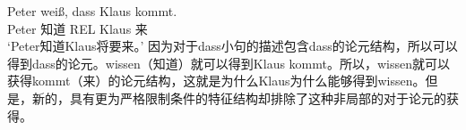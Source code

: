 \ea
\gll Peter weiß, dass Klaus kommt.\\
	 Peter 知道 REL Klaus 来\\
\glt `Peter知道Klaus将要来。'
\z
因为对于dass小句的描述包含dass的论元结构，所以可以得到dass的论元。wissen（知道）就可以得到Klaus kommt。所以，wissen就可以获得kommt（来）的论元结构，这就是为什么Klaus为什么能够得到wissen。但是，新的，具有更为严格限制条件的特征结构却排除了这种非局部的对于论元的获得。


